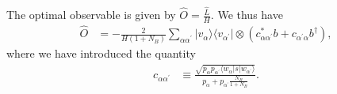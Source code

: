 \documentclass[../../note.tex]{subfiles}
\begin{document}
\begin{lemma}
    The optimal observable is given by $\hat{O} = \frac{\hat{L}}{H}$. We thus have
    \begin{align}
        \hat{O}
        &= -\frac{2}{H(1+N_B)} \sum_{\alpha \alpha^\prime} \vert v_{\alpha} \rangle \langle v_{\alpha^\prime} \vert \otimes \left(c^\ast_{\alpha \alpha^\prime} b + c_{\alpha^\prime \alpha} b^\dagger \right),
    \end{align}
    where we have introduced the quantity 
    \begin{align}
        c_{\alpha \alpha^\prime} 
        &\equiv \frac{\sqrt{p_{\alpha} p_{\alpha^\prime}\langle w_{\alpha} \vert s \vert w_{\alpha^\prime} \rangle}}{p_{\alpha} + p_{\alpha^\prime} \frac{N_B}{1+N_B}}.
    \end{align}
\end{lemma}
\end{document}
